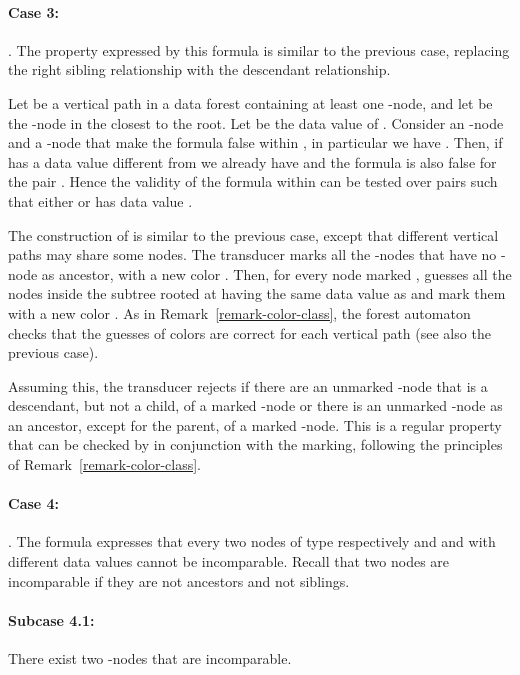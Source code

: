 \documentclass{CSML}
\begin{document}
\paragraph{\bf Case 3:}
.
The property expressed by this formula is similar to the previous case,
replacing the right sibling relationship with the descendant relationship.

Let  be a vertical path in a data forest  containing at least one
-node, and let  be the -node in  the closest to
the root. Let  be the data value of .
Consider an -node  and a -node  that make the formula
false within , in particular we have . Then, if  has a data
value different from  we already have  and the formula is
also false for the pair .
Hence the validity of the formula within  can be tested over pairs  such that
either  or  has data value .

\noindent
The construction of  is similar to the previous case, except that different
vertical paths may share some nodes.
The transducer  marks all the -nodes 
that have no -node as ancestor, with a new color . 
Then, for every node  marked ,  guesses all the
nodes inside the subtree rooted at  having the same data value as
 and mark them with a new color .
As in Remark~\ref{remark-color-class}, the forest automaton  checks that the guesses of
colors are correct for each vertical path (see also the previous case).

Assuming this, the transducer  rejects if there are an unmarked
-node that is a descendant, but not a child, of a
marked -node or there is an unmarked -node as
an ancestor, except for the parent, of a marked -node.  
This is a regular property that can be checked by  in conjunction with the marking,
following the principles of Remark~\ref{remark-color-class}. 

\paragraph{\bf Case 4:}
.
The formula expresses that every two nodes of type respectively  and
 and with different data values cannot be incomparable.
Recall that two nodes are incomparable if they are not ancestors and not siblings.

\paragraph{\bf Subcase 4.1:} There exist two -nodes that are incomparable. 
\end{document}

